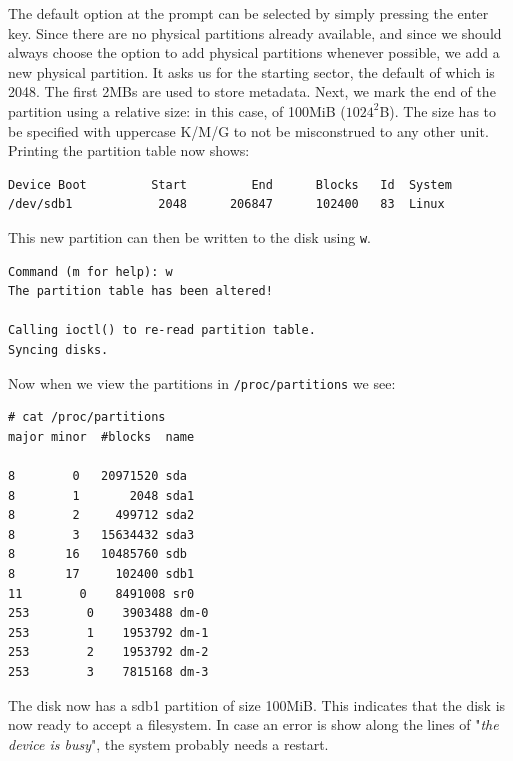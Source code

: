 \noindent
The default option at the prompt can be selected by simply pressing the enter key. Since there are no physical partitions already available, and since we should always choose the option to add physical partitions whenever possible, we add a new physical partition. It asks us for the starting sector, the default of which is 2048. The first 2MBs are used to store metadata. Next, we mark the end of the partition using a relative size: in this case, of 100MiB ($1024^2$B). The size has to be specified with uppercase K/M/G to not be misconstrued to any other unit. Printing the partition table now shows:

\vspace{-15pt}
\begin{verbatim}	
Device Boot         Start         End      Blocks   Id  System
/dev/sdb1            2048      206847      102400   83  Linux
\end{verbatim}
\vspace{-10pt}

\noindent
This new partition can then be written to the disk using \verb|w|. 

\vspace{-15pt}
\begin{verbatim}
Command (m for help): w
The partition table has been altered!

Calling ioctl() to re-read partition table.
Syncing disks.
\end{verbatim}
\vspace{-10pt}

\noindent
Now when we view the partitions in \verb|/proc/partitions| we see:

\vspace{-15pt}
\begin{verbatim}
# cat /proc/partitions
major minor  #blocks  name

8        0   20971520 sda
8        1       2048 sda1
8        2     499712 sda2
8        3   15634432 sda3
8       16   10485760 sdb
8       17     102400 sdb1
11        0    8491008 sr0
253        0    3903488 dm-0
253        1    1953792 dm-1
253        2    1953792 dm-2
253        3    7815168 dm-3
\end{verbatim}
\vspace{-10pt}

\noindent
The disk now has a sdb1 partition of size 100MiB. This indicates that the disk is now ready to accept a filesystem. In case an error is show along the lines of "\textit{the device is busy}", the system probably needs a restart. 

